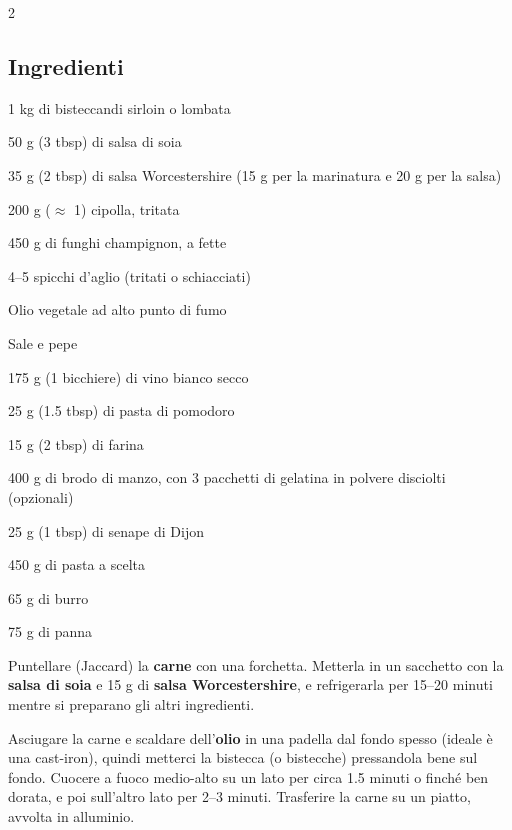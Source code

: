 \newpage
{}
\vspace*{-0.5 cm}
\begin{multicols}{2}
	\subsection*{Ingredienti}
	\begin{ingredients}
		\item 1 kg di bisteccandi sirloin o lombata
		\item 50 g (3 tbsp) di salsa di soia
		\item 35 g (2 tbsp) di salsa Worcestershire (15 g per la marinatura e 20 g per la salsa)
		\item 200 g ($\approx$ 1) cipolla, tritata
		\item 450 g di funghi champignon, a fette
		\item 4--5 spicchi d'aglio (tritati o schiacciati)
		\item Olio vegetale ad alto punto di fumo
		\item Sale e pepe
		\item 175 g (1 bicchiere) di vino bianco secco
		\item 25 g (1.5 tbsp) di pasta di pomodoro
		\item 15 g (2 tbsp) di farina
		\item 400 g di brodo di manzo, con 3 pacchetti di gelatina in polvere disciolti (opzionali)
		\item 25 g (1 tbsp) di senape di Dijon
		\item 450 g di pasta a scelta
		\item 65 g di burro
		\item 75 g di panna
	\end{ingredients}

\end{multicols}

\vspace*{-0.3cm}

Puntellare (Jaccard) la \textbf{carne} con una forchetta.
Metterla in un sacchetto con la \textbf{salsa di soia} e 15 g di \textbf{salsa Worcestershire}, e refrigerarla per 15--20 minuti mentre si preparano gli altri ingredienti.

Asciugare la carne e scaldare dell'\textbf{olio} in una padella dal fondo spesso (ideale è una cast-iron), quindi metterci la bistecca (o bistecche) pressandola bene sul fondo. 
Cuocere a fuoco medio-alto su un lato per circa 1.5 minuti o finché ben dorata, e poi sull'altro lato per 2--3 minuti.
Trasferire la carne su un piatto, avvolta in alluminio.

